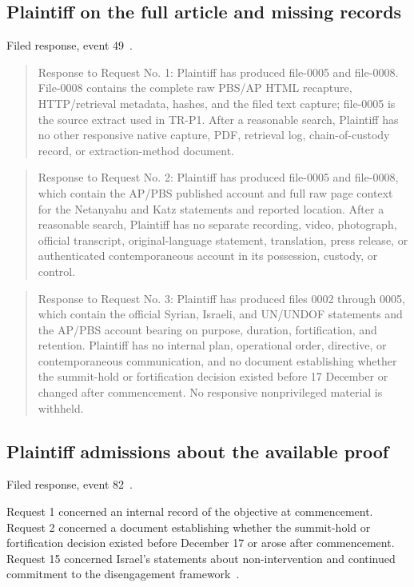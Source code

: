 \subsection{Plaintiff on the full article and missing records}

Filed response, event 49~\cite{record}.

\begin{quote}
Response to Request No. 1: Plaintiff has produced file-0005 and file-0008. File-0008 contains the complete raw PBS/AP HTML recapture, HTTP/retrieval metadata, hashes, and the filed text capture; file-0005 is the source extract used in TR-P1. After a reasonable search, Plaintiff has no other responsive native capture, PDF, retrieval log, chain-of-custody record, or extraction-method document.
\end{quote}

\begin{quote}
Response to Request No. 2: Plaintiff has produced file-0005 and file-0008, which contain the AP/PBS published account and full raw page context for the Netanyahu and Katz statements and reported location. After a reasonable search, Plaintiff has no separate recording, video, photograph, official transcript, original-language statement, translation, press release, or authenticated contemporaneous account in its possession, custody, or control.
\end{quote}

\begin{quote}
Response to Request No. 3: Plaintiff has produced files 0002 through 0005, which contain the official Syrian, Israeli, and UN/UNDOF statements and the AP/PBS account bearing on purpose, duration, fortification, and retention. Plaintiff has no internal plan, operational order, directive, or contemporaneous communication, and no document establishing whether the summit-hold or fortification decision existed before 17 December or changed after commencement. No responsive nonprivileged material is withheld.
\end{quote}

\subsection{Plaintiff admissions about the available proof}

Filed response, event 82~\cite{record}.

Request 1 concerned an internal record of the objective at commencement.  Request 2 concerned a document establishing whether the summit-hold or fortification decision existed before December 17 or arose after commencement.  Request 15 concerned Israel's statements about non-intervention and continued commitment to the disengagement framework~\cite[event 79]{record}.


